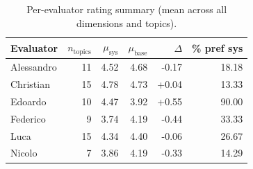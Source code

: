 \begin{table}[htbp]
\centering
\caption{Per-evaluator rating summary (mean across all dimensions and topics).}
\label{tab:per_evaluator}
\small
\begin{tabular}{lrrrrr}
\toprule
Evaluator & $n_\mathrm{topics}$ & $\mu_\mathrm{sys}$ & $\mu_\mathrm{base}$ & $\Delta$ & \% pref sys \\
\midrule
Alessandro & 11 & 4.52 & 4.68 & -0.17 & 18.18 \\
Christian & 15 & 4.78 & 4.73 & +0.04 & 13.33 \\
Edoardo & 10 & 4.47 & 3.92 & +0.55 & 90.00 \\
Federico & 9 & 3.74 & 4.19 & -0.44 & 33.33 \\
Luca & 15 & 4.34 & 4.40 & -0.06 & 26.67 \\
Nicolo & 7 & 3.86 & 4.19 & -0.33 & 14.29 \\
\bottomrule
\end{tabular}
\end{table}
